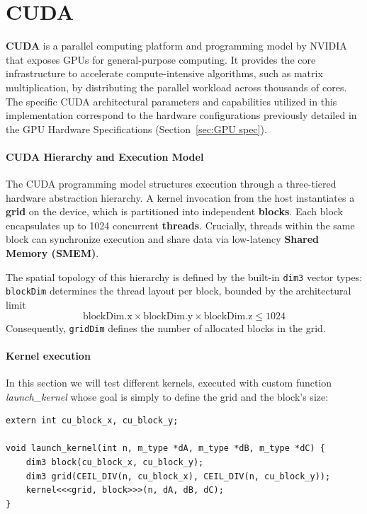 \section{CUDA}\label{sec:CUDA}

\textbf{CUDA} is a parallel computing platform and programming model by NVIDIA that exposes GPUs for general-purpose computing. It provides the core infrastructure to accelerate compute-intensive algorithms, such as matrix multiplication, by distributing the parallel workload across thousands of cores.
The specific CUDA architectural parameters and capabilities utilized in this implementation correspond to the hardware configurations previously detailed in the GPU Hardware Specifications (Section~\ref{sec:GPU spec}). 

\paragraph{CUDA Hierarchy and Execution Model}
The CUDA programming model structures execution through a three-tiered hardware abstraction hierarchy. A kernel invocation from the host instantiates a \textbf{grid} on the device, which is partitioned into independent \textbf{blocks}. Each block encapsulates up to 1024 concurrent \textbf{threads}. Crucially, threads within the same block can synchronize execution and share data via low-latency \textbf{Shared Memory (SMEM)}.

The spatial topology of this hierarchy is defined by the built-in \texttt{dim3} vector types: \texttt{blockDim} determines the thread layout per block, bounded by the architectural limit $$\text{blockDim.x} \times \text{blockDim.y} \times \text{blockDim.z} \leq 1024$$
Consequently, \texttt{gridDim} defines the number of allocated blocks in the grid.

\paragraph{Kernel execution}
In this section we will test different kernels, executed with custom function \emph{launch\_kernel} whose goal is simply to define the grid and the block's size: 

\begin{lstlisting}[style=CStyle, caption={Example code to launch the Naive Kernel: the block's sizes can be defined at runtime. }, label={lst:cuda_launch_kernel}]
extern int cu_block_x, cu_block_y;

void launch_kernel(int n, m_type *dA, m_type *dB, m_type *dC) {
    dim3 block(cu_block_x, cu_block_y);
    dim3 grid(CEIL_DIV(n, cu_block_x), CEIL_DIV(n, cu_block_y));
    kernel<<<grid, block>>>(n, dA, dB, dC);
}
\end{lstlisting}

